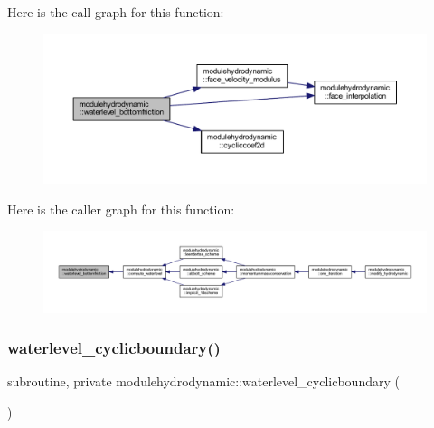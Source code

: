 Here is the call graph for this function\+:\nopagebreak
\begin{figure}[H]
\begin{center}
\leavevmode
\includegraphics[width=350pt]{namespacemodulehydrodynamic_ae585f218a774bfbfdd6f830f47de4d2a_cgraph}
\end{center}
\end{figure}
Here is the caller graph for this function\+:\nopagebreak
\begin{figure}[H]
\begin{center}
\leavevmode
\includegraphics[width=350pt]{namespacemodulehydrodynamic_ae585f218a774bfbfdd6f830f47de4d2a_icgraph}
\end{center}
\end{figure}
\mbox{\label{namespacemodulehydrodynamic_a07cbcb571bac038116c36df1b277df63}} 
\subsubsection{\texorpdfstring{waterlevel\+\_\+cyclicboundary()}{waterlevel\_cyclicboundary()}}
{\footnotesize\ttfamily subroutine, private modulehydrodynamic\+::waterlevel\+\_\+cyclicboundary (\begin{DoxyParamCaption}{ }\end{DoxyParamCaption})\hspace{0.3cm}{\ttfamily [private]}}

